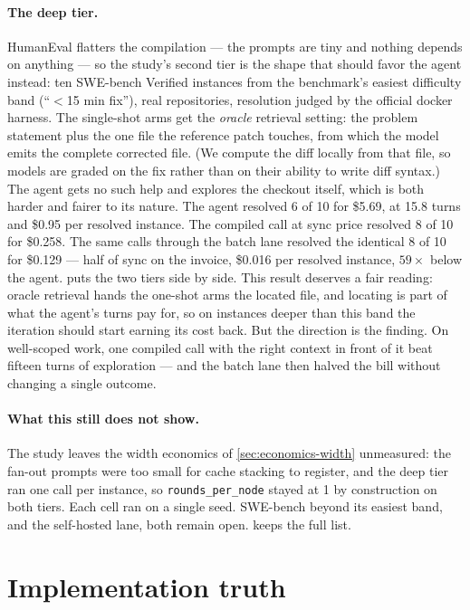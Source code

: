 \documentclass[11pt]{article}
\begin{document}
\paragraph{The deep tier.} HumanEval flatters the compilation --- the
prompts are tiny and nothing depends on anything --- so the study's
second tier is the shape that should favor the agent instead: ten
SWE-bench Verified instances from the benchmark's easiest difficulty
band (``$<$15 min fix''), real repositories, resolution judged by the
official docker harness. The single-shot arms get the \emph{oracle}
retrieval setting: the problem statement plus the one file the reference
patch touches, from which the model emits the complete corrected file.
(We compute the diff locally from that file, so models are graded on the
fix rather than on their ability to write diff syntax.) The agent gets
no such help and explores the checkout itself, which is both harder and
fairer to its nature. The agent resolved 6 of 10 for \$5.69, at 15.8
turns and \$0.95 per resolved instance. The compiled call at sync price
resolved 8 of 10 for \$0.258. The same calls through the batch lane
resolved the identical 8 of 10 for \$0.129 --- half of sync on the
invoice, \$0.016 per resolved instance, $59\times$ below the agent.
 puts the two tiers side by side. This result
deserves a fair reading: oracle retrieval hands the one-shot arms the
located file, and locating is part of what the agent's turns pay for, so
on instances deeper than this band the iteration should start earning
its cost back. But the direction is the finding. On well-scoped work,
one compiled call with the right context in front of it beat fifteen
turns of exploration --- and the batch lane then halved the bill without
changing a single outcome.

\paragraph{What this still does not show.} The study leaves the width
economics of \cref{sec:economics-width} unmeasured: the fan-out prompts
were too small for cache stacking to register, and the deep tier ran one
call per instance, so \texttt{rounds\_per\_node} stayed at 1 by
construction on both tiers. Each cell ran on a single seed. SWE-bench
beyond its easiest band, and the self-hosted lane, both remain open.
 keeps the full list.

\section{Implementation truth}
\label{sec:implementation}
\end{document}
